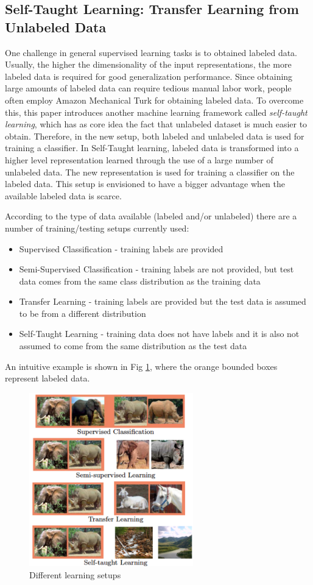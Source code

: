 \documentclass[10pt,journal,a4paper]{IEEEtran}
\begin{document}
\subsection{Self-Taught Learning: Transfer Learning from Unlabeled Data}
 
One challenge in general supervised learning tasks is to obtained labeled data. Usually, the higher the dimensionality of the input representations, the more labeled data is required for good generalization performance. Since obtaining large amounts of labeled data can require tedious manual labor work, people often employ Amazon Mechanical Turk for obtaining labeled data. To overcome this, this paper introduces another machine learning framework called \textit{self-taught learning}, which has as core idea the fact that unlabeled dataset is much easier to obtain. Therefore, in the new setup, both labeled and unlabeled data is used for training a classifier. In Self-Taught learning, labeled data is transformed into a higher level representation learned through the use of a large number of unlabeled data. The new representation  is used for training a classifier on the labeled data. This setup is envisioned to have a bigger advantage when the available labeled data is scarce. 


According to the type of data available (labeled and/or unlabeled) there are a number of training/testing setups currently used:
\begin{itemize}
\item Supervised Classification - training labels are provided
\item Semi-Supervised Classification - training labels are not provided, but test data comes from the same class distribution as the training data
\item Transfer Learning - training labels are provided but the test data is assumed to be from a different distribution
\item Self-Taught Learning - training data does not have labels and it is also not assumed to come from the same distribution as the test data
\end{itemize}
An intuitive example is shown in Fig \ref{fig_sim}, where the orange bounded boxes represent labeled data.
\begin{figure}[!t]
\centering
\includegraphics[width=2.8in]{selftaught.png}
\caption{Different learning setups}
\label{fig_sim}
\end{figure}
\end{document}
